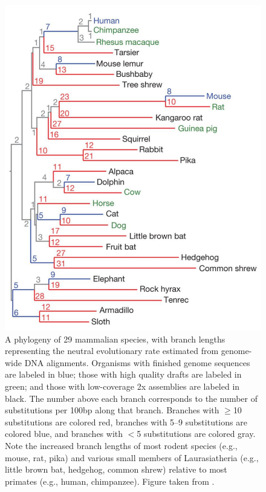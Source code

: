 \begin{figure}
\centering
\includegraphics[scale=0.3]{Figs/mammals_29.pdf}
\caption{A phylogeny of 29 mammalian species, with branch lengths
  representing the neutral evolutionary rate estimated from
  genome-wide DNA alignments. Organisms with finished genome sequences
  are labeled in blue; those with high quality drafts are labeled in
  green; and those with low-coverage 2x assemblies are labeled in
  black. The number above each branch corresponds to the number of
  substitutions per 100bp along that branch. Branches with $\ge$10
  substitutions are colored red, branches with 5--9 substitutions are
  colored blue, and branches with $<$5 substitutions are colored
  gray. Note the increased branch lengths of most rodent species
  (e.g., mouse, rat, pika) and various small members of Laurasiatheria
  (e.g., little brown bat, hedgehog, common shrew) relative to most
  primates (e.g., human, chimpanzee). Figure taken from
  \citet{LindbladToh2011}.}
\label{fig_mammals_29}
\end{figure}

